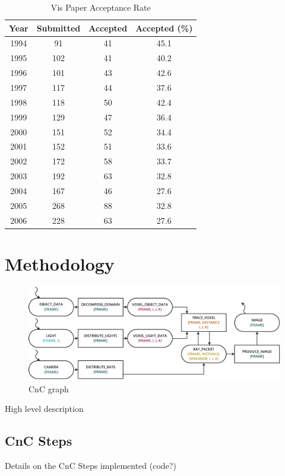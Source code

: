\documentclass{vgtc}                          %
\begin{document}
\begin{table}
  \caption{Vis Paper Acceptance Rate}
  \label{vis_accept}
  \scriptsize
  \begin{center}
    \begin{tabular}{cccc}
      Year & Submitted & Accepted & Accepted (\%)\\
    \hline
      1994 &  91 & 41 & 45.1\\
      1995 & 102 & 41 & 40.2\\
      1996 & 101 & 43 & 42.6\\
      1997 & 117 & 44 & 37.6\\
      1998 & 118 & 50 & 42.4\\
      1999 & 129 & 47 & 36.4\\
      2000 & 151 & 52 & 34.4\\
      2001 & 152 & 51 & 33.6\\
      2002 & 172 & 58 & 33.7\\
      2003 & 192 & 63 & 32.8\\
      2004 & 167 & 46 & 27.6\\
      2005 & 268 & 88 & 32.8\\
      2006 & 228 & 63 & 27.6
    \end{tabular}
  \end{center}
\end{table}

\section{Methodology}

\begin{figure}[htb]
  \centering
  \includegraphics[width=\textwidth]{drawings/CnC.pdf}
  \caption{CnC graph}
\end{figure}

High level description

\subsection{CnC Steps}
Details on the CnC Steps implemented (code?)
\end{document}
